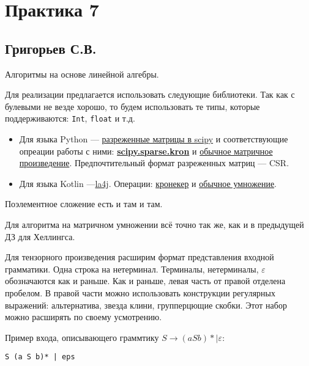 \section{Практика 7}

\subsection{Григорьев С.В.}

Алгоритмы на основе линейной алгебры.

Для реализации предлагается использовать следующие библиотеки. Так как с булевыми не везде хорошо, то будем использовать те типы, которые поддерживаются: \verb|Int|, \verb|float| и т.д.
\begin{itemize}
    \item Для языка Python --- \href{https://docs.scipy.org/doc/scipy/reference/sparse.html}{разреженные матрицы в scipy} и соответствующие опреации работы с ними: \href{https://docs.scipy.org/doc/scipy-0.14.0/reference/generated/scipy.sparse.kron.html}{\textbf{scipy.sparse.kron}} и \href{https://docs.scipy.org/doc/scipy/reference/generated/scipy.sparse.csr_matrix.html}{обычное матричное произведение}. Предпочтительный формат разреженных матриц --- CSR.
    \item Для языка Kotlin ---\href{http://la4j.org/}{la4j}. Операции: \href{http://la4j.org/apidocs/org/la4j/operation/ooplace/OoPlaceKroneckerProduct.html}{кронекер} и  \href{http://la4j.org/apidocs/org/la4j/operation/ooplace/OoPlaceMatricesMultiplication.html}{обычное умножение}.
\end{itemize}

Поэлементное сложение есть и там и там.

Для алгоритма на матричном умножении всё точно так же, как и в предыдущей ДЗ для Хеллингса.

Для тензорного произведения расширим формат представления входной грамматики.
Одна строка на нетерминал. Терминалы, нетерминалы, $\varepsilon$ обозначаются как и раньше.
Как и раньше, левая часть от правой отделена пробелом. В правой части можно использовать конструкции регулярных выражений: альтернатива, звезда клини, групперцющие скобки. Этот набор можно расширять по своему усмотрению.


Пример входа, описывающего граммтику $S \to (a S b)* \mid \varepsilon$:

\begin{verbatim}
S (a S b)* | eps
\end{verbatim}



